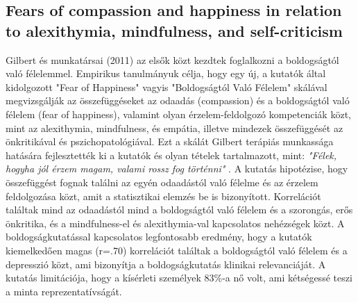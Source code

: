 \subsection{Fears of compassion and happiness in relation
	to alexithymia, mindfulness, and self-criticism \cite{gilbert_mcewan_gibbons_chotai_duarte_matos_2011}}
Gilbert és munkatársai (2011) az elsők közt kezdtek foglalkozni a boldogságtól való félelemmel. Empirikus tanulmányuk célja, hogy egy új, a kutatók által kidolgozott "Fear of Happiness" vagyis "Boldogságtól Való Félelem" skálával \cite{gilbert_mcewan_gibbons_chotai_duarte_matos_2011} megvizsgálják az összefüggéseket az odaadás (compassion) és a boldogságtól való félelem (fear of happiness), valamint olyan érzelem-feldolgozó kompetenciák közt, mint az  alexithymia, mindfulness, és empátia, illetve mindezek összefüggését az önkritikával és pszichopatológiával. Ezt a skálát Gilbert terápiás munkassága hatására fejlesztették ki a kutatók és olyan tételek tartalmazott, mint: \textit{"Félek, hogyha jól érzem magam, valami rossz fog történni"} \cite[o. 381]{gilbert_mcewan_gibbons_chotai_duarte_matos_2011}. A kutatás hipotézise, hogy összefüggést fognak találni az egyén odaadástól való félelme és az érzelem feldolgozása közt, amit a statisztikai elemzés be is bizonyított. Korrelációt találtak mind az odaadástól mind a boldogságtól való félelem és a szorongás, erős önkritika, és a mindfulness-el és alexithymia-val kapcsolatos nehézségek közt. A boldogságkutatással kapcsolatos legfontosabb eredmény, hogy a kutatók kiemelkedően magas (r=.70) korrelációt találtak a boldogságtól való félelem és a depresszió közt, ami bizonyítja a boldogságkutatás klinikai relevanciáját. A kutatás limitációja, hogy a kísérleti személyek 83\%-a nő volt, ami kétségessé teszi a minta reprezentatívságát.

\subsection{}




